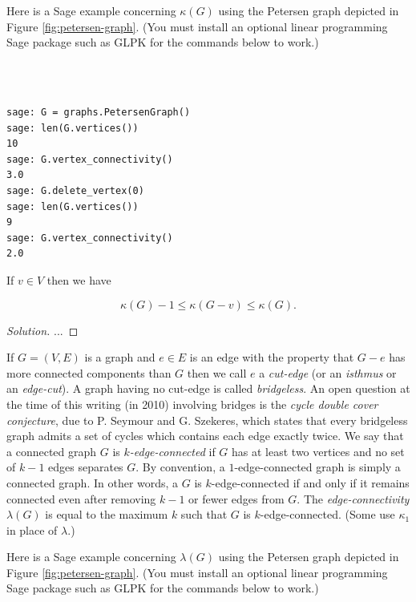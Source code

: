 Here is a Sage example concerning 
$\kappa(G)$ using the Petersen graph 
depicted in Figure \ref{fig:petersen-graph}.
(You must install an optional linear programming
Sage package such as GLPK for the commands below to work.)
%
\begin{center}
\fontsize{9pt}{9pt}
\selectfont
\tt
\begin{lstlisting}

sage: G = graphs.PetersenGraph()
sage: len(G.vertices())
10
sage: G.vertex_connectivity()
3.0
sage: G.delete_vertex(0)
sage: len(G.vertices())
9
sage: G.vertex_connectivity()
2.0

\end{lstlisting}
\end{center}
%

\begin{lemma}
{\rm
If $v\in V$ then we have

\[
\kappa(G)-1\leq \kappa(G-v)\leq \kappa(G).
\]
}
\end{lemma}

\begin{proof}[Solution]

...
\end{proof}


If $G=(V,E)$ is a graph and $e\in E$ is an edge with the property
that $G-e$ has more connected components than $G$ then
we call $e$ a {\it cut-edge} (or an {\it isthmus} or an {\it edge-cut}).
A graph having no cut-edge is called {\it bridgeless}.
An open question at the time of this writing
(in 2010) involving bridges is the 
{\it cycle double cover conjecture}, due to P. Seymour and G. Szekeres, 
which states that every bridgeless graph admits a set
of cycles which contains each edge exactly twice.
We say that a connected graph $G$ is {\it $k$-edge-connected}
if
$G$ has at least two vertices and no set of $k-1$ edges separates $G$.
By convention, a $1$-edge-connected graph is simply a connected
graph. In other words, a $G$ is $k$-edge-connected if and only if 
it remains connected even after removing $k-1$ or fewer edges
from $G$. The {\it edge-connectivity}
$\lambda(G)$ is equal to the maximum $k$ such that
$G$ is $k$-edge-connected. (Some use
$\kappa_1$ in place of $\lambda$.)

Here is a Sage example concerning 
$\lambda(G)$ using the Petersen graph 
depicted in Figure \ref{fig:petersen-graph}.
(You must install an optional linear programming
Sage package such as GLPK for the commands below to work.)

